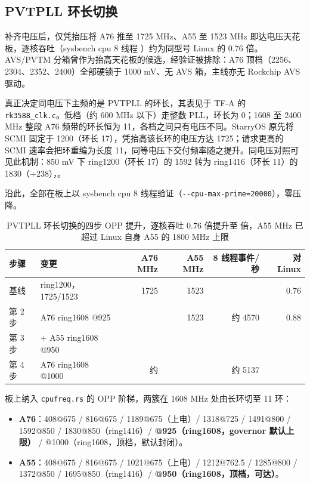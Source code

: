 \subsection{PVTPLL 环长切换}

补齐电压后，仅凭抬压将 A76 推至 1725 MHz、A55 至 1523 MHz 即达电压天花板，逐核吞吐（sysbench cpu 8 线程 \nLadderB{}）约为同型号 Linux 的 0.76 倍。AVS/PVTM 分箱曾作为抬高天花板的候选，经验证被排除：A76 顶档（2256、2304、2352、2400）全部硬锁于 1000 mV、无 AVS 箱，主线亦无 Rockchip AVS 驱动。

真正决定同电压下主频的是 PVTPLL 的环长，其表见于 TF-A 的 \texttt{rk3588\_clk.c}。低档（约 600 MHz 以下）走整数 PLL，环长为 0；1608 至 2400 MHz 整段 A76 频带的环长恒为 11，各档之间只有电压不同。StarryOS 原先将 SCMI 固定于 1200（环长 17），凭抬高该长环的电压方达 1725；请求更高的 SCMI 速率会把环重编为长度 11，同等电压下交付频率随之提升。同电压对照可见此机制：850 mV 下 ring1200（环长 17）的 1592 转为 ring1416（环长 11）的 1830（+238），。

沿此，全部在板上以 sysbench cpu 8 线程验证（\texttt{-{}-cpu-max-prime=20000}），零压降。

\begin{table}[H]\centering\small
\begin{tabular}{@{}llrrrr@{}}
\toprule
步骤 & 变更 & A76 MHz & A55 MHz & 8 线程事件/秒 & 对 Linux \nCpuTEightLin{} \\
\midrule
基线 & ring1200，1725/1523 & 1725 & 1523 & \nLadderB{} & 0.76 \\
第 2 步 & A76 ring1608 @925 & \nDvfsAseven{} & 1523 & 约 4570 & 0.88 \\
第 3 步 & + A55 ring1608 @950 & \nDvfsAseven{} & \nDvfsAfive{} & \nCpuTEight{} & \nCpuTEightRatio{} \\
第 4 步 & A76 ring1608 @1000 & 约 \nDvfsAsevenTop{} & \nDvfsAfive{} & 约 5137 & \nPerCoreRatio{} \\
\bottomrule
\end{tabular}
\caption{PVTPLL 环长切换的四步 OPP 提升，逐核吞吐 0.76 倍提升至 \nPerCoreRatio{} 倍，A55 \nDvfsAfive{} MHz 已超过 Linux 自身 A55 的 1800 MHz 上限}
\end{table}

板上纳入 \texttt{cpufreq.rs} 的 OPP 阶梯，两簇在 1608 MHz 处由长环切至 11 环：

\begin{itemize}
\item \textbf{A76}：408@675 / 816@675 / 1189@675（上电）/ 1318@725 / 1491@800 / 1592@850 / 1830@850（ring1416）/ \textbf{\nDvfsAseven{}@925（ring1608，governor 默认上限）} / \nDvfsAsevenTop{}@1000（ring1608，顶档，默认封闭）。
\item \textbf{A55}：408@675 / 816@675 / 1021@675（上电）/ 1212@762.5 / 1285@800 / 1372@850 / 1695@850（ring1416）/ \textbf{\nDvfsAfive{}@950（ring1608，顶档，可达）}。
\end{itemize}

